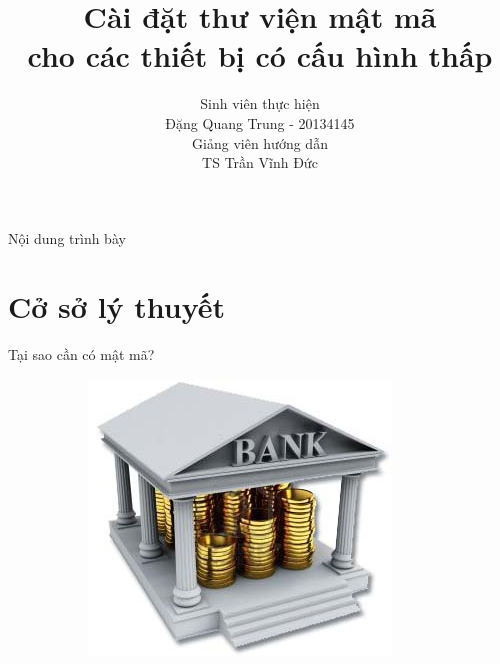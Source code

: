 \documentclass[compress]{beamer}
\title[Cài đặt thư viện mật mã cho TBCHT]{Cài đặt thư viện mật mã  \\ cho các thiết bị có cấu hình thấp}
\author[Đặng Quang Trung - 20134145]{
Sinh viên thực hiện\\
Đặng Quang Trung - 20134145 \\[1em]
Giảng viên hướng dẫn\\
TS Trần Vĩnh Đức}
\begin{document}
\begin{frame}[plain]
\titlepage
\end{frame}

\begin{frame}[plain]{Nội dung trình bày}
\tableofcontents
\end{frame}

\section{Cở sở lý thuyết}
\begin{frame}{Tại sao cần có mật mã?}
\begin{figure}[h]
\begin{subfigure}{.35\textwidth}
  \centering
  \includegraphics[width=1\linewidth]{../bank.jpg}
  \label{fig:sfig1}
\end{subfigure}%
\begin{subfigure}{.35\textwidth}
  \centering

\end{subfigure}
\end{figure}
\end{frame}
\end{document}
